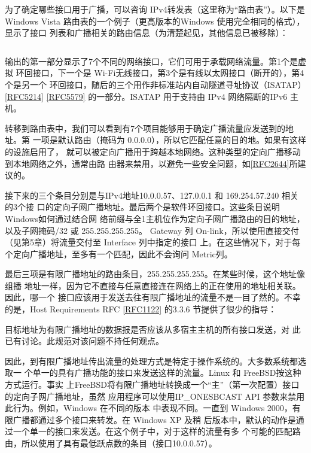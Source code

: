 为了确定哪些接口用于广播，可以咨询 IPv4转发表（这里称为“路由表”）。以下是
Windows Vista 路由表的一个例子（更高版本的Windows 使用完全相同的格式），显示了接口
列表和广播相关的路由信息（为清楚起见，其他信息已被移除）：

\begin{verbatim}
\end{verbatim}

输出的第一部分显示了7个不同的网络接口，它们可用于承载网络流量。第1个是虚拟
环回接口，下一个是 Wi-Fi无线接口，第3个是有线以太网接口（断开的），第4个是另一个
环回接口，随后的三个用作非标准站内自动隧道寻址协议（ISATAP）\href{https://www.rfc-editor.org/rfc/rfc5214}{[RFC5214]} \href{https://www.rfc-editor.org/rfc/rfc5579}{[RFC5579]}
的一部分。ISATAP 用于支持由 IPv4 网络隔断的IPv6 主机。

转移到路由表中，我们可以看到有7个项目能够用于确定广播流量应发送到的地址。第
一项是默认路由（掩码为 0.0.0.0），所以它匹配任意的目的地。如果有这样的设施启用了，
就可以被定向广播用于跨越本地网络。这种类型的定向广播移动到本地网络之外，通常由路
由器来禁用，以避免一些安全问题，如\href{https://www.rfc-editor.org/rfc/rfc2644}{[RFC2644]}所建议的。

接下来的三个条目分别是与IPv4地址10.0.0.57、127.0.0.1 和 169.254.57.240 相关的3个接
口的定向子网广播地址。最后两个是软件环回接口。这些条目说明Windows如何通过结合网
络前缀与全1主机位作为定向子网广播路由的目的地址，以及子网掩码/32 或 255.255.255.255。
Gateway 列 On-link，所以使用直接交付（见第5章）将流量交付至 Interface 列中指定的接口
上。在这些情况下，对于每个定向广播地址，至多有一个匹配，因此不会询问 Metric列。

最后三项是有限广播地址的路由条目，255.255.255.255。在某些时候，这个地址像组播
地址一样，因为它不直接与任意直接连在网络上的正在使用的地址相关联。因此，哪一个
接口应该用于发送去往有限广播地址的流量不是一目了然的。不幸的是，Host Requirements
RFC \href{https://www.rfc-editor.org/rfc/rfc1122}{[RFC1122]} 的3.3.6 节提供了很少的指导：

\begin{tcolorbox}
    目标地址为有限广播地址的数据报是否应该从多宿主主机的所有接口发送，对
    此已有讨论。此规范对该问题不持任何观点。
\end{tcolorbox}

因此，到有限广播地址传出流量的处理方式是特定于操作系统的。大多数系统都选取一
个单一的具有广播功能的接口来发送这样的流量。Linux 和 FreeBSD按这种方式运行。事实
上FreeBSD将有限广播地址转换成一个“主”（第一次配置）接口的定向子网广播地址，虽然
应用程序可以使用IP\_ONESBCAST API 参数来禁用此行为。例如，Windows 在不同的版本
中表现不同。一直到 Windows 2000，有限广播都通过多个接口来转发。在 Windows XP 及稍
后版本中，默认的动作是通过一个单一的接口来发送。在这个例子中，对于这样的流量有多
个可能的匹配路由，所以使用了具有最低跃点数的条目（接口10.0.0.57）。

